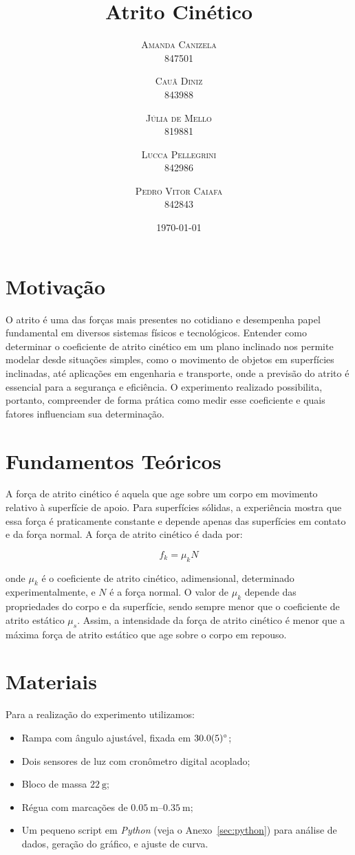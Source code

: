 \documentclass[10pt,oneside,twocolumn,a4paper]{article}
\title{Atrito Cinético}
\author{
	\textsc{Amanda Canizela} \\[1ex]
	\normalsize{847501}
	\and \textsc{Cauã Diniz} \\[1ex]
	\normalsize{843988}
	\and \textsc{Júlia de Mello} \\[1ex]
	\normalsize{819881}
	\and \textsc{Lucca Pellegrini} \\[1ex]
	\normalsize{842986}
	\and \textsc{Pedro Vitor Caiafa} \\[1ex]
	\normalsize{842843}
}
\date{\today}
\begin{document}
\maketitle

\section{Motivação}

O atrito é uma das forças mais presentes no cotidiano e desempenha papel
fundamental em diversos sistemas físicos e tecnológicos. Entender como
determinar o coeficiente de atrito cinético em um plano inclinado nos permite
modelar desde situações simples, como o movimento de objetos em superfícies
inclinadas, até aplicações em engenharia e transporte, onde a previsão do
atrito é essencial para a segurança e eficiência. O experimento realizado
possibilita, portanto, compreender de forma prática como medir esse coeficiente
e quais fatores influenciam sua determinação.

\section{Fundamentos Teóricos}

A força de atrito cinético é aquela que age sobre um corpo em movimento
relativo à superfície de apoio. Para superfícies sólidas, a experiência mostra
que essa força é praticamente constante e depende apenas das superfícies em
contato e da força normal. A força de atrito cinético é dada por:

\begin{equation*}
f_k = \mu_k N
\end{equation*}

onde $\mu_k$ é o coeficiente de atrito cinético, adimensional, determinado
experimentalmente, e $N$ é a força normal. O valor de $\mu_k$ depende das
propriedades do corpo e da superfície, sendo sempre menor que o coeficiente de
atrito estático $\mu_s$. Assim, a intensidade da força de atrito cinético é
menor que a máxima força de atrito estático que age sobre o corpo em repouso.

\section{Materiais}

Para a realização do experimento utilizamos:

\begin{itemize}
    \item Rampa com ângulo ajustável, fixada em $\SI{30 \pm 0.5}{\degree}$;
    \item Dois sensores de luz com cronômetro digital acoplado;
    \item Bloco de massa $\SI{22}{\gram}$;
	\item Régua com marcações de $\SIrange{0.05}{0.35}{\metre};$
	\item Um pequeno script em \textit{Python} (veja o Anexo~\ref{sec:python})
		para análise de dados, geração do gráfico, e ajuste de curva.
\end{itemize}
\end{document}
